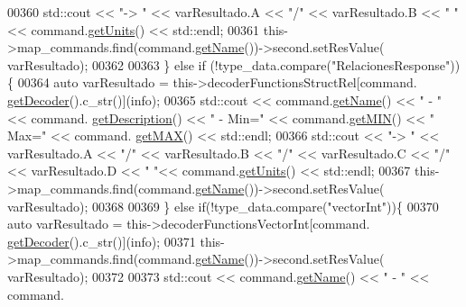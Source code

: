 \begin{DoxyCode}
{{{{{{{{{{00360                                     std::cout << \textcolor{stringliteral}{"-> "} << varResultado.A << \textcolor{stringliteral}{"/"} << varResultado.B << \textcolor{stringliteral}{" "}<< 
      command.\hyperlink{classCommands_ac67214a4fbd93fbb4d8ebb2dd815a3fa}{getUnits}() << std::endl;
00361                                     this->map\_commands.find(command.\hyperlink{classCommands_adf3d8a96310b1f4e57a6ecf0f2f153ea}{getName}())->second.setResValue(
      varResultado);
00362 
00363                                 \} \textcolor{keywordflow}{else} \textcolor{keywordflow}{if} (!type\_data.compare(\textcolor{stringliteral}{"RelacionesResponse"})) \{
00364                                     \textcolor{keyword}{auto} varResultado = this->decoderFunctionsStructRel[command.
      \hyperlink{classCommands_a8b4c2a655d8dd3de334338d6684d469c}{getDecoder}().c\_str()](info);
00365                                     std::cout << command.\hyperlink{classCommands_adf3d8a96310b1f4e57a6ecf0f2f153ea}{getName}() << \textcolor{stringliteral}{" - "} << command.
      \hyperlink{classCommands_ad82fe7dfcf1908423bdb59d048020e26}{getDescription}() << \textcolor{stringliteral}{" - Min="} << command.\hyperlink{classCommands_af0a1e2ea65b5a57997c721a8d77a1013}{getMIN}() << \textcolor{stringliteral}{" Max="} << command.
      \hyperlink{classCommands_afbad1051313d0cdecba276384cb7fc6b}{getMAX}() << std::endl;
00366                                     std::cout << \textcolor{stringliteral}{"-> "} << varResultado.A << \textcolor{stringliteral}{"/"} << varResultado.B << \textcolor{stringliteral}{"/"} <<
       varResultado.C << \textcolor{stringliteral}{"/"} << varResultado.D << \textcolor{stringliteral}{" "}<< command.\hyperlink{classCommands_ac67214a4fbd93fbb4d8ebb2dd815a3fa}{getUnits}() << std::endl;
00367                                     this->map\_commands.find(command.\hyperlink{classCommands_adf3d8a96310b1f4e57a6ecf0f2f153ea}{getName}())->second.setResValue(
      varResultado);
00368 
00369                                 \} \textcolor{keywordflow}{else} \textcolor{keywordflow}{if}(!type\_data.compare(\textcolor{stringliteral}{"vectorInt"}))\{
00370                                     \textcolor{keyword}{auto} varResultado = this->decoderFunctionsVectorInt[command.
      \hyperlink{classCommands_a8b4c2a655d8dd3de334338d6684d469c}{getDecoder}().c\_str()](info);
00371                                     this->map\_commands.find(command.\hyperlink{classCommands_adf3d8a96310b1f4e57a6ecf0f2f153ea}{getName}())->second.setResValue(
      varResultado);
00372 
00373                                     std::cout << command.\hyperlink{classCommands_adf3d8a96310b1f4e57a6ecf0f2f153ea}{getName}() << \textcolor{stringliteral}{" - "} << command.
}}}}}}}}}}
\end{DoxyCode}
